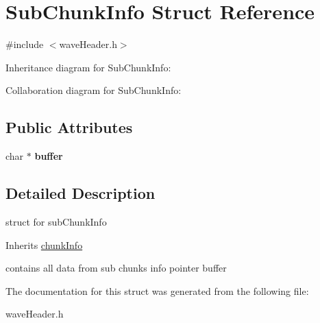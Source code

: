 \hypertarget{structSubChunkInfo}{}\section{Sub\+Chunk\+Info Struct Reference}
\label{structSubChunkInfo}


{\ttfamily \#include $<$wave\+Header.\+h$>$}



Inheritance diagram for Sub\+Chunk\+Info\+:


Collaboration diagram for Sub\+Chunk\+Info\+:
\subsection*{Public Attributes}
\begin{DoxyCompactItemize}
\item 
\mbox{\label{structSubChunkInfo_ac7b875659415ca6cb6c755769f36ba65}} 
char $\ast$ {\bfseries buffer}
\end{DoxyCompactItemize}


\subsection{Detailed Description}
struct for sub\+Chunk\+Info

Inherits \hyperlink{structchunkInfo}{chunk\+Info}

contains all data from sub chunks info pointer \textquotesingle{}buffer\textquotesingle{} 

The documentation for this struct was generated from the following file\+:\begin{DoxyCompactItemize}
\item 
wave\+Header.\+h\end{DoxyCompactItemize}
